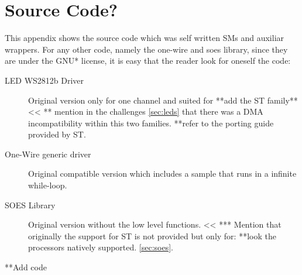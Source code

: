\chapter{Source Code?}\label{appx:code}
This appendix shows the source code which was self written SMs and auxiliar wrappers. For any other code, namely the one-wire and soes library, since 
they are under the GNU* license, it is easy that the reader look for oneself the code:
\begin{description}
    \item[LED WS2812b Driver] Original version only for one channel and suited for **add the ST family** << ** mention in the challenges \ref{sec:leds}
        that there was a DMA incompatibility within this two families. **refer to the porting guide provided by ST.
    \item[One-Wire generic driver] Original compatible version which includes a sample that runs in a infinite while-loop.
    \item[SOES Library] Original version without the low level functions. << *** Mention that originally the support for ST is not provided but only for: **look 
        the processors natively supported. \ref{sec:soes}.
\end{description}


**Add code
